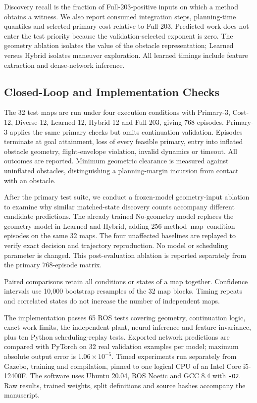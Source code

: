 Discovery recall is the fraction of Full-203-positive inputs on which a method obtains a witness. We also report consumed integration steps, planning-time quantiles and selected-primary cost relative to Full-203. Predicted work does not enter the test priority because the validation-selected exponent is zero. The geometry ablation isolates the value of the obstacle representation; Learned versus Hybrid isolates maneuver exploration. All learned timings include feature extraction and dense-network inference.

\subsection{Closed-Loop and Implementation Checks}
The 32 test maps are run under four execution conditions with Primary-3, Cost-12, Diverse-12, Learned-12, Hybrid-12 and Full-203, giving 768 episodes. Primary-3 applies the same primary checks but omits continuation validation. Episodes terminate at goal attainment, loss of every feasible primary, entry into inflated obstacle geometry, flight-envelope violation, invalid dynamics or timeout. All outcomes are reported. Minimum geometric clearance is measured against uninflated obstacles, distinguishing a planning-margin incursion from contact with an obstacle.

After the primary test suite, we conduct a frozen-model geometry-input ablation to examine why similar matched-state discovery counts accompany different candidate predictions. The already trained No-geometry model replaces the geometry model in Learned and Hybrid, adding 256 method--map--condition episodes on the same 32 maps. The four unaffected baselines are replayed to verify exact decision and trajectory reproduction. No model or scheduling parameter is changed. This post-evaluation ablation is reported separately from the primary 768-episode matrix.

Paired comparisons retain all conditions or states of a map together. Confidence intervals use 10,000 bootstrap resamples of the 32 map blocks. Timing repeats and correlated states do not increase the number of independent maps.

The implementation passes 65 ROS tests covering geometry, continuation logic, exact work limits, the independent plant, neural inference and feature invariance, plus ten Python scheduling-replay tests. Exported network predictions are compared with PyTorch on 32 real validation examples per model; maximum absolute output error is $1.06\times10^{-5}$. Timed experiments run separately from Gazebo, training and compilation, pinned to one logical CPU of an Intel Core i5-12400F. The software uses Ubuntu 20.04, ROS Noetic and GCC 8.4 with \texttt{-O2}. Raw results, trained weights, split definitions and source hashes accompany the manuscript.
